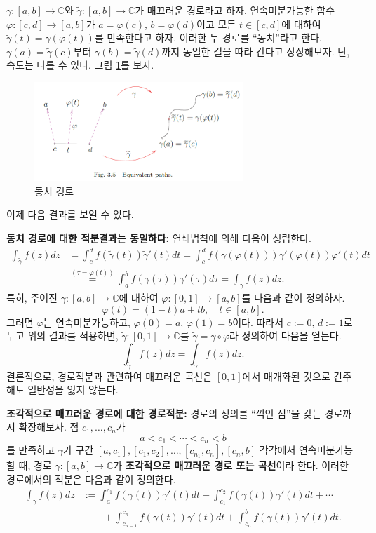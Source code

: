 $\gamma:[a,b] \to \mathbb C$와  $\tilde\gamma:[a,b] \to \mathbb C$가
매끄러운 경로라고 하자.
연속미분가능한 함수 $\varphi:[c,d] \to [a,b]$가
$a=\varphi(c)$, $b=\varphi(d)$이고 모든 $t\in[c,d]$에 대하여
$\tilde\gamma(t) = \gamma(\varphi(t))$를 만족한다고 하자.
이러한 두 경로를 ``동치''라고 한다.
$\gamma(a) = \tilde\gamma(c)$부터 $\gamma(b) = \tilde\gamma(d)$까지
동일한 길을 따라 간다고 상상해보자. 단, 속도는 다를 수 있다.
그림 \ref{fig-3-5}를 보자. 
\begin{figure}[!h]
\begin{center}
\includegraphics[width=0.7\textwidth]{./SaltChapter/fig-3-5}
\end{center}
\caption{동치 경로}
\label{fig-3-5}
\end{figure}
이제 다음 결과를 보일 수 있다.

{\bf 동치 경로에 대한 적분결과는 동일하다:}
연쇄법칙에 의해 다음이 성립한다.
\begin{align*}
\int_{\tilde\gamma}f(z)dz
&= \int_c^d f(\tilde\gamma(t))\tilde\gamma'(t)dt
= \int_c^d f(\gamma(\varphi(t)))\gamma'(\varphi(t)) \varphi'(t)dt \\
&\stackrel{(\tau=\varphi(t))}=
\int_a^b f(\gamma(\tau))\gamma'(\tau)d\tau
= \int_{\gamma}f(z)dz.
\end{align*}
특히, 주어진 $\gamma:[a,b]\to\mathbb C$에 대하여
$\varphi: [0,1]\to [a,b]$를 다음과 같이 정의하자.
\[
\varphi(t) = (1-t)a + tb, \quad t\in [a,b].
\]
그러면 $\varphi$는 연속미분가능하고,
$\varphi(0)=a$, $\varphi(1)=b$이다.
따라서 $c:=0$, $d:=1$로 두고 위의 결과를 적용하면,
$\tilde\gamma : [0,1]\to\mathbb C$를
$\tilde\gamma = \gamma\circ\varphi$라 정의하여
다음을 얻는다.
\[
\int_{\tilde\gamma} f(z)dz = \int_\gamma f(z)dz.
\]
결론적으로, 경로적분과 관련하여
매끄러운 곡선은 $[0,1]$에서 매개화된 것으로 간주해도 일반성을 잃지 않는다.

{\bf 조각적으로 매끄러운 경로에 대한 경로적분:}
경로의 정의를 ``꺽인 점''을 갖는 경로까지 확장해보자.
점 $c_1, \ldots, c_n$가
\[
a<c_1 < \cdots <c_n <b
\]
를 만족하고 $\gamma$가 구간 $[a,c_1], [c_1,c_2], \ldots, [c_{n_1}, c_n], [c_n,b]$ 각각에서
연속미분가능할 때,
경로 $\gamma:[a,b]\to\mathbb C$가 {\bf 조각적으로 매끄러운 경로 또는 곡선}이라 한다.
이러한 경로에서의 적분은 다음과 같이 정의한다.
\begin{align*}
\int_\gamma f(z)dz
&:= \int_a^{c_1} f(\gamma(t))\gamma'(t)dt + \int_{c_1}^{c_2} f(\gamma(t))\gamma'(t)dt
+ \cdots \\
&\quad \quad + \int_{c_{n-1}}^{c_n} f(\gamma(t))\gamma'(t)dt 
+ \int_{c_n}^b f(\gamma(t))\gamma'(t)dt.
\end{align*}

